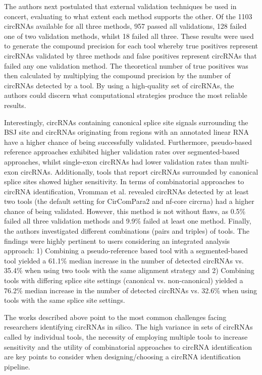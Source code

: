 The authors next postulated that external validation techniques be used in concert, evaluating to what extent each method supports the other. Of the 1103 circRNAs available for all three methods, 957 passed all validations, 128 failed one of two validation methods, whilst 18 failed all three. These results were used to generate the compound precision for each tool whereby true positives represent circRNAs validated by three methods and false positives represent circRNAs that failed any one validation method. The theoretical number of true positives was then calculated by multiplying the compound precision by the number of circRNAs detected by a tool. By using a high-quality set of circRNAs, the authors could discern what computational strategies produce the most reliable results. \par

Interestingly, circRNAs containing canonical splice site signals surrounding the BSJ site and circRNAs originating from regions with an annotated linear RNA have a higher chance of being successfully validated. Furthermore, pseudo-based reference approaches exhibited higher validation rates over segmented-based approaches, whilst single-exon circRNAs had lower validation rates than multi-exon circRNAs. Additionally, tools that report circRNAs surrounded by canonical splice sites showed higher sensitivity.
In terms of combinatorial approaches to circRNA identification, Vromman et al. revealed circRNAs detected by at least two tools (the default setting for CirComPara2 and nf-core circrna) had a higher chance of being validated. However, this method is not without flaws, as 0.5\% failed all three validation methods and 9.9\% failed at least one method. Finally, the authors investigated different combinations (pairs and triples) of tools. The findings were highly pertinent to users considering an integrated analysis approach: 1) Combining a pseudo-reference based tool with a segmented-based tool yielded a 61.1\% median increase in the number of detected circRNAs vs. 35.4\% when using two tools with the same alignment strategy and 2) Combining tools with differing splice site settings (canonical vs. non-canonical) yielded a 76.2\% median increase in the number of detected circRNAs vs. 32.6\% when using tools with the same splice site settings. \par

The works described above point to the most common challenges facing researchers identifying circRNAs in silico. The high variance in sets of circRNAs called by individual tools, the necessity of employing multiple tools to increase sensitivity and the utility of combinatorial approaches to circRNA identification are key points to consider when designing/choosing a circRNA identification pipeline.



